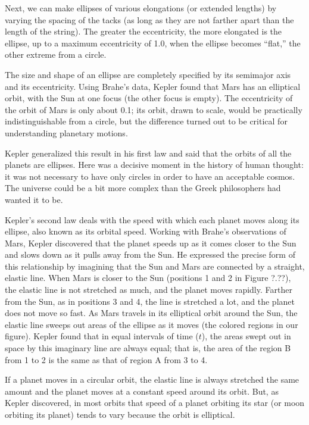\documentclass[../../main-astronomy.tex]{subfiles}
\begin{document}
Next, we can make ellipses of various elongations (or extended lengths) by varying the spacing of the tacks (as long as they are not farther apart than the length of the string). The greater the eccentricity, the more elongated is the ellipse, up to a maximum eccentricity of 1.0, when the ellipse becomes ``flat,'' the other extreme from a circle.

\vspace{1em}

The size and shape of an ellipse are completely specified by its semimajor axis and its eccentricity. Using Brahe's data, Kepler found that Mars has an elliptical orbit, with the Sun at one focus (the other focus is empty). The eccentricity of the orbit of Mars is only about 0.1; its orbit, drawn to scale, would be practically indistinguishable from a circle, but the difference turned out to be critical for understanding planetary motions.

\vspace{1em}

Kepler generalized this result in his first law and said that the orbits of all the planets are ellipses. Here was a decisive moment in the history of human thought: it was not necessary to have only circles in order to have an acceptable cosmos. The universe could be a bit more complex than the Greek philosophers had wanted it to be.

\vspace{1em}

Kepler's second law deals with the speed with which each planet moves along its ellipse, also known as its orbital speed. Working with Brahe's observations of Mars, Kepler discovered that the planet speeds up as it comes closer to the Sun and slows down as it pulls away from the Sun. He expressed the precise form of this relationship by imagining that the Sun and Mars are connected by a straight, elastic line. When Mars is closer to the Sun (positions 1 and 2 in Figure ?.??), the elastic line is not stretched as much, and the planet moves rapidly. Farther from the Sun, as in positions 3 and 4, the line is stretched a lot, and the planet does not move so fast. As Mars travels in its elliptical orbit around the Sun, the elastic line sweeps out areas of the ellipse as it moves (the colored regions in our figure). Kepler found that in equal intervals of time ($t$), the areas swept out in space by this imaginary line are always equal; that is, the area of the region B from 1 to 2 is the same as that of region A from 3 to 4.

\vspace{1em}

If a planet moves in a circular orbit, the elastic line is always stretched the same amount and the planet moves at a constant speed around its orbit. But, as Kepler discovered, in most orbits that speed of a planet orbiting its star (or moon orbiting its planet) tends to vary because the orbit is elliptical.
\end{document}
